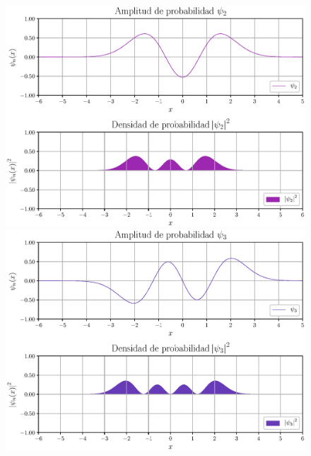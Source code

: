 \begin{figure}[H]
    \centering
    \includegraphics[scale=0.6]{Imagenes/Funcion_Onda_02.eps}
    \includegraphics[scale=0.6]{Imagenes/Funcion_Onda_03.eps}
\end{figure}
